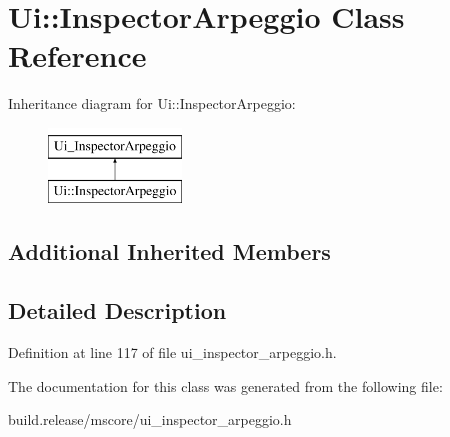 \hypertarget{class_ui_1_1_inspector_arpeggio}{}\section{Ui\+:\+:Inspector\+Arpeggio Class Reference}
\label{class_ui_1_1_inspector_arpeggio}
Inheritance diagram for Ui\+:\+:Inspector\+Arpeggio\+:\begin{figure}[H]
\begin{center}
\leavevmode
\includegraphics[height=2.000000cm]{class_ui_1_1_inspector_arpeggio}
\end{center}
\end{figure}
\subsection*{Additional Inherited Members}


\subsection{Detailed Description}


Definition at line 117 of file ui\+\_\+inspector\+\_\+arpeggio.\+h.



The documentation for this class was generated from the following file\+:\begin{DoxyCompactItemize}
\item 
build.\+release/mscore/ui\+\_\+inspector\+\_\+arpeggio.\+h\end{DoxyCompactItemize}
